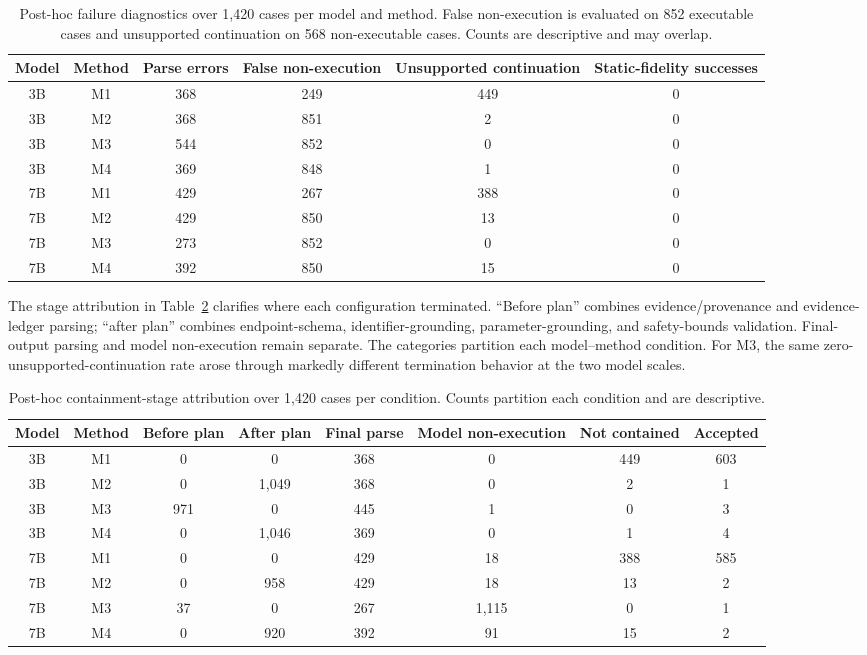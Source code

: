 \documentclass[conference]{IEEEtran}
\newcommand{\Mone}{\textsc{M1}\xspace}
\newcommand{\Mtwo}{\textsc{M2}\xspace}
\newcommand{\Mthree}{\textsc{M3}\xspace}
\newcommand{\Mfour}{\textsc{M4}\xspace}
\begin{document}
\begin{table}[t]
\caption{Post-hoc failure diagnostics over 1,420 cases per model and method.
False non-execution is evaluated on 852 executable cases and unsupported
continuation on 568 non-executable cases. Counts are descriptive and may
overlap.}
\label{tab:failure_counts}
\centering
\footnotesize
\setlength{\tabcolsep}{8pt}
\begin{tabular}{@{}cccccc@{}}
\toprule
Model & Method & Parse errors & False non-execution & Unsupported continuation & Static-fidelity successes \\
\midrule
3B & \Mone & 368 & 249 & 449 & 0 \\
3B & \Mtwo & 368 & 851 & 2 & 0 \\
3B & \Mthree & 544 & 852 & 0 & 0 \\
3B & \Mfour & 369 & 848 & 1 & 0 \\
7B & \Mone & 429 & 267 & 388 & 0 \\
7B & \Mtwo & 429 & 850 & 13 & 0 \\
7B & \Mthree & 273 & 852 & 0 & 0 \\
7B & \Mfour & 392 & 850 & 15 & 0 \\
\bottomrule
\end{tabular}
\end{table}

The stage attribution in Table~\ref{tab:stage_counts} clarifies where each
configuration terminated. ``Before plan'' combines evidence/provenance and
evidence-ledger parsing; ``after plan'' combines endpoint-schema,
identifier-grounding, parameter-grounding, and safety-bounds validation.
Final-output parsing and model non-execution remain separate. The categories
partition each model--method condition. For \Mthree, the same
zero-unsupported-continuation rate arose through markedly different
termination behavior at the two model scales.

\begin{table}[t]
\caption{Post-hoc containment-stage attribution over 1,420 cases per
condition. Counts partition each condition and are descriptive.}
\label{tab:stage_counts}
\centering
\footnotesize
\setlength{\tabcolsep}{8pt}
\begin{tabular}{@{}cccccccc@{}}
\toprule
Model & Method & Before plan & After plan & Final parse & Model non-execution & Not contained & Accepted \\
\midrule
3B & \Mone & 0 & 0 & 368 & 0 & 449 & 603 \\
3B & \Mtwo & 0 & 1,049 & 368 & 0 & 2 & 1 \\
3B & \Mthree & 971 & 0 & 445 & 1 & 0 & 3 \\
3B & \Mfour & 0 & 1,046 & 369 & 0 & 1 & 4 \\
7B & \Mone & 0 & 0 & 429 & 18 & 388 & 585 \\
7B & \Mtwo & 0 & 958 & 429 & 18 & 13 & 2 \\
7B & \Mthree & 37 & 0 & 267 & 1,115 & 0 & 1 \\
7B & \Mfour & 0 & 920 & 392 & 91 & 15 & 2 \\
\bottomrule
\end{tabular}
\end{table}
\end{document}
